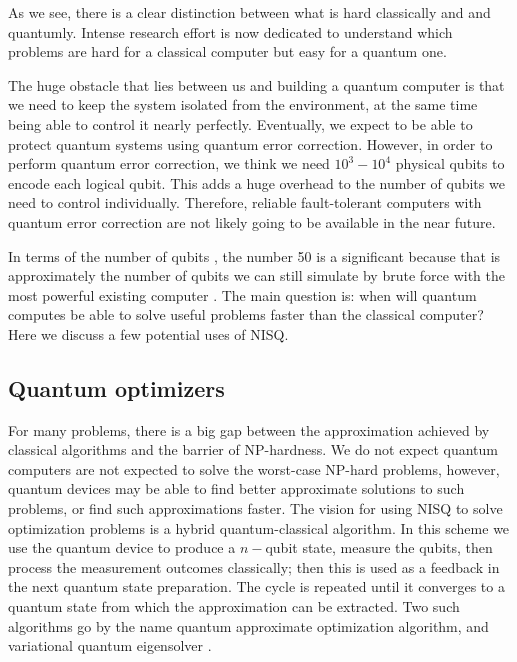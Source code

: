 As we see, there is a clear distinction between what is hard classically and and quantumly. Intense research effort is now dedicated to understand which problems are hard for a classical computer but easy for a quantum one.


The huge obstacle that lies between us and building a quantum computer is that we need to keep the system isolated from the environment, at the same time being able to control it nearly perfectly. Eventually, we expect to be able to protect quantum systems using quantum error correction. 
However, in order to perform quantum error correction, we think we need $10^3 - 10^4$ physical qubits to encode each logical qubit. This adds a huge overhead to the number of qubits we need to control individually. Therefore, reliable fault-tolerant computers with quantum error correction are not likely going to be available in the near future.


In terms of the number of qubits , the number 50 is a significant because that is approximately the number of qubits we can still simulate by brute force with the most powerful existing computer \cite{boixo2018characterizing}. The main question is: when will quantum computes be able to solve useful problems faster than the classical computer?
Here we discuss a few potential uses of NISQ.


\subsection{Quantum optimizers}
For many problems, there is a big gap between the approximation achieved by classical algorithms and the barrier of NP-hardness. We do not expect quantum computers are not expected to solve the worst-case NP-hard problems, however, quantum devices may be able to find better approximate solutions to such problems, or find such approximations faster. The vision for using NISQ to solve optimization problems is a hybrid quantum-classical algorithm. In this scheme we use the quantum device to produce a $n-$qubit state, measure the qubits, then process the measurement outcomes classically; then this is used as a feedback in the next quantum state preparation. The cycle is repeated until it converges to a quantum state from which the approximation can be extracted. Two such algorithms go by the name quantum approximate optimization algorithm\cite{farhi2014quantum}, and variational quantum eigensolver \cite{mcclean2016theory}.


